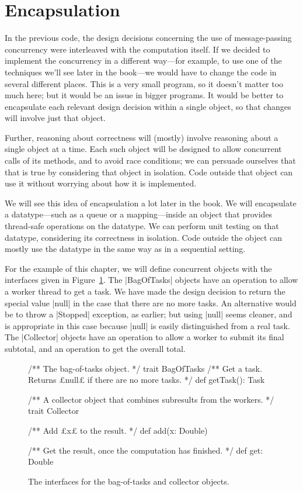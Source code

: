 \section{Encapsulation}
\label{sec:bag-of-tasks-encapsulation}

In the previous code, the design decisions concerning the use of
message-passing concurrency were interleaved with the computation itself.  If
we decided to implement the concurrency in a different way---for example, to
use one of the techniques we'll see later in the book---we would have to
change the code in several different places.  This is a very small program, so
it doesn't matter too much here; but it would be an issue in bigger programs.
%
It would be better to encapsulate each relevant design decision within a
single object, so that changes will involve just that object. 

Further, reasoning about correctness will (mostly) involve reasoning about a
single object at a time.  Each such object will be designed to allow
concurrent calls of its methods, and to avoid race conditions; we can persuade
ourselves that that is true by considering that object in isolation.  Code
outside that object can use it without worrying about how it is implemented.

We will see this idea of encapsulation a lot later in the book.  We will
encapsulate a datatype---such as a queue or a mapping---inside an object that
provides thread-safe operations on the datatype.  We can perform unit testing
on that datatype, considering its correctness in isolation.  Code outside the
object can mostly use the datatype in the same way as in a sequential setting.


For the example of this chapter, we will define concurrent objects with the
interfaces given in Figure~\ref{fig:BoT-interfaces}.  The |BagOfTasks| objects
have an operation to allow a worker thread to get a task.  We have made the
design decision to return the special value |null| in the case that there are
no more tasks.  An alternative would be to throw a |Stopped| exception, as
earlier; but using |null| seems cleaner, and is appropriate in this case
because |null| is easily distinguished from a real task.  The |Collector|
objects have an operation to allow a worker to submit its final subtotal, and
an operation to get the overall total.


\begin{figure}
\begin{scala}
  /** The bag-of-tasks object. */
  trait BagOfTasks{
    /** Get a task.  Returns £null£ if there are no more tasks. */
    def getTask(): Task 
  }  

  /** A collector object that combines subresults from the workers. */
  trait Collector{
    /** Add £x£ to the result. */
    def add(x: Double) 

    /** Get the result, once the computation has finished. */
    def get: Double 
  }
\end{scala}
\caption{The interfaces for the bag-of-tasks and collector objects.}
\label{fig:BoT-interfaces}
\end{figure}

